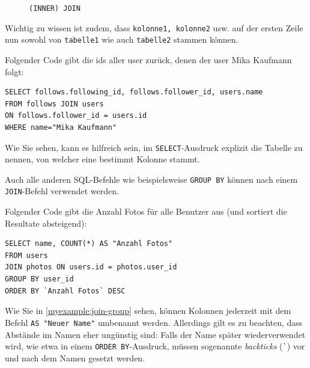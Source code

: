 \begin{figure}[H]
  \centering
  \caption{\lstinline[style=sql]|(INNER) JOIN|}
  \label{fig:venn-join}
\end{figure}

Wichtig zu wissen ist zudem, dass \texttt{kolonne1, kolonne2} usw. auf der ersten Zeile nun sowohl von \texttt{tabelle1} wie auch \texttt{tabelle2} stammen können.

\begin{myexample}
Folgender Code gibt die ids aller user zurück, denen der user Mika Kaufmann folgt:
\begin{lstlisting}[style=sql]
SELECT follows.following_id, follows.follower_id, users.name 
FROM follows JOIN users 
ON follows.follower_id = users.id 
WHERE name="Mika Kaufmann"
\end{lstlisting}

Wie Sie sehen, kann es hilfreich sein, im \lstinline[style=sql]|SELECT|-Ausdruck explizit die Tabelle zu nennen, von welcher eine bestimmt Kolonne stammt.
\end{myexample}

Auch alle anderen SQL-Befehle wie beispielsweise \lstinline[style=sql]|GROUP BY| können nach einem \lstinline[style=sql]|JOIN|-Befehl verwendet werden.

\begin{myexample}\label{myexample:join-group}
Folgender Code gibt die Anzahl Fotos für alle Benutzer aus (und sortiert die Resultate absteigend):
\begin{lstlisting}[style=sql]
SELECT name, COUNT(*) AS "Anzahl Fotos"
FROM users
JOIN photos ON users.id = photos.user_id
GROUP BY user_id
ORDER BY `Anzahl Fotos` DESC
\end{lstlisting}
\end{myexample}

\begin{mycaution}
  Wie Sie in \cref{myexample:join-group} sehen, können Kolonnen jederzeit mit dem Befehl \lstinline[style=sql]|AS "Neuer Name"| umbenannt werden. Allerdings gilt es zu beachten, dass Abstände im Namen eher ungünstig sind: Falls der Name später wiederverwendet wird, wie etwa in einem \lstinline[style=sql]|ORDER BY|-Ausdruck, müssen sogenannte \textit{backticks} (\lstinline[style=sql]|`|) vor und nach dem Namen gesetzt werden.
\end{mycaution}

